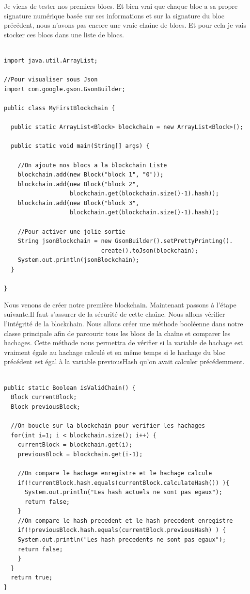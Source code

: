 \documentclass[12pt]{report}
\begin{document}
Je viens de tester nos premiers blocs. Et bien vrai que chaque bloc a sa propre signature numérique basée sur ses informations et sur la signature du bloc précédent, nous n'avons pas encore une vraie chaîne de blocs. Et pour cela je vais stocker ces blocs dans une liste de blocs.

\begin{lstlisting}

import java.util.ArrayList;

//Pour visualiser sous Json
import com.google.gson.GsonBuilder;

public class MyFirstBlockchain {

  public static ArrayList<Block> blockchain = new ArrayList<Block>(); 

  public static void main(String[] args) {	
  
    //On ajoute nos blocs a la blockchain Liste 
    blockchain.add(new Block("block 1", "0"));		
    blockchain.add(new Block("block 2", 
                   blockchain.get(blockchain.size()-1).hash)); 
    blockchain.add(new Block("block 3", 
                   blockchain.get(blockchain.size()-1).hash));
	
    //Pour activer une jolie sortie
    String jsonBlockchain = new GsonBuilder().setPrettyPrinting().
                            create().toJson(blockchain);		
    System.out.println(jsonBlockchain);
  }

}
\end{lstlisting}

Nous venons de créer notre première blockchain. Maintenant passons à l'étape suivante.Il faut s'assurer de la sécurité de cette chaîne. Nous allons  vérifier l'intégrité de la blockchain. Nous allons créer une méthode booléenne dans notre classe principale afin de parcourir tous les blocs de la chaîne et comparer les hachages. Cette méthode nous permettra de vérifier si la variable de hachage est vraiment égale au hachage calculé et en même temps si le hachage du bloc précédent est égal à la variable previousHash qu'on avait calculer précédemment.

\begin{lstlisting}

public static Boolean isValidChain() {
  Block currentBlock; 
  Block previousBlock;
	
  //On boucle sur la blockchain pour verifier les hachages
  for(int i=1; i < blockchain.size(); i++) {
    currentBlock = blockchain.get(i);
    previousBlock = blockchain.get(i-1);
    
    //On compare le hachage enregistre et le hachage calcule
    if(!currentBlock.hash.equals(currentBlock.calculateHash()) ){
      System.out.println("Les hash actuels ne sont pas egaux");			
      return false;
    }
    //On compare le hash precedent et le hash precedent enregistre
    if(!previousBlock.hash.equals(currentBlock.previousHash) ) {
    System.out.println("Les hash precedents ne sont pas egaux");
    return false;
    }
  }
  return true;
}

\end{lstlisting}
\end{document}
